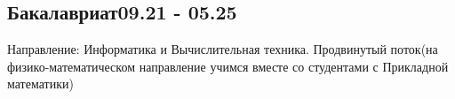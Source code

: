 \vspace*{10pt}

\vspace*{6pt}
\subsection{{Бакалавриат}\hfill 09.21 - 05.25}
\vspace*{5pt}
Направление: Информатика и Вычислительная техника. Продвинутый поток(на физико-математическом направление учимся вместе со студентами с Прикладной математики)
